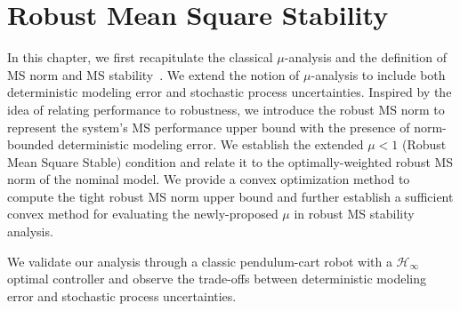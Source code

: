 \chapter{Robust Mean Square Stability}
\label{chap:RMSS}
In this chapter, we first recapitulate the classical $\mu$-analysis and the definition of MS norm and MS stability~\cite{Elia2005stabfading}. We extend the notion of $\mu$-analysis to include both deterministic modeling error and stochastic process uncertainties. Inspired by the idea of relating performance to robustness, we introduce the robust MS norm to represent the system's MS performance upper bound with the presence of norm-bounded deterministic modeling error. We establish the extended \(\mu<1\) (Robust Mean Square Stable) condition and relate it to the optimally-weighted robust MS norm of the nominal model. We provide a convex optimization method to compute the tight robust MS norm upper bound and further establish a sufficient convex method for evaluating the newly-proposed \(\mu\) in robust MS stability analysis.

We validate our analysis through a classic pendulum-cart robot with a \(\mathcal{H}_\infty\) optimal controller and observe the trade-offs between deterministic modeling error and stochastic process uncertainties.





